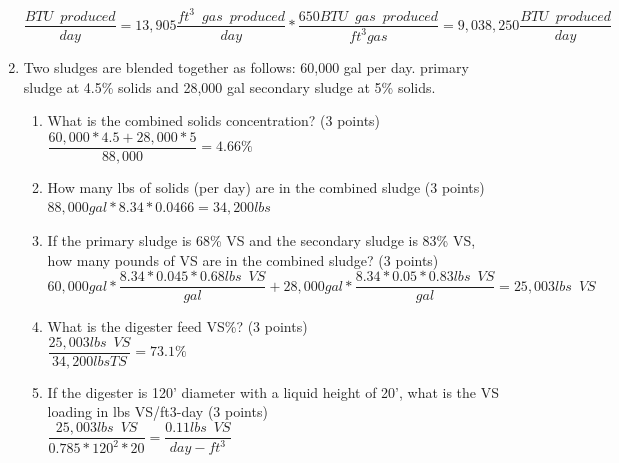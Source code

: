 \documentclass{article}
\begin{document}
\begin{enumerate}
{
$
	\dfrac 
	{
	BTU \enspace produced
	}
	{
	day
	}
	=
	13,905 \dfrac
			{
			ft^3 \enspace gas \enspace produced
			}
			{
			day
			}
			*
		\dfrac
		{
		650 BTU \enspace gas \enspace produced
		}
		{
		ft^3 gas
		}
		=9,038,250 \dfrac
				{
				BTU \enspace produced
				}
				{
				day
				}
$
}

\item Two sludges are blended together as follows: 60,000 gal per day. primary sludge at 4.5\% solids and 28,000 gal secondary sludge at 5\% solids. 
\begin{enumerate}
\item What is the combined solids concentration?  (3 points)\\

$\dfrac{60,000*4.5+28,000*5}{88,000}=\boxed{4.66\%}$\\
\vspace{2cm}
\item How many lbs of solids (per day) are in the combined sludge (3 points)\\

$88,000 gal*8.34*0.0466 = \boxed{34,200 lbs}$\\
\vspace{2cm}


\item If the primary sludge is 68\% VS and the secondary sludge is 83\% VS, how many pounds of VS are in the combined sludge? (3 points)\\
$60,000 gal *\dfrac{8.34*0.045*0.68lbs \enspace VS}{gal}+28,000 gal *\dfrac{8.34*0.05*0.83lbs \enspace VS}{gal}=\boxed{25,003 lbs \enspace VS}$
\vspace{2cm}

\item What is the digester feed VS\%?  (3 points)\\
$\dfrac{25,003 lbs \enspace VS}{34,200 lbs TS}=\boxed{73.1\%}$

\vspace{2cm}



\item If the digester is 120’ diameter with a liquid height of 20’, what is the VS loading in lbs VS/ft3-day (3 points)\\

$\dfrac{25,003 lbs \enspace VS}{0.785*120^2*20}=\boxed{\dfrac{0.11 lbs \enspace VS}{day-ft^3}}$\\
\vspace{2cm}






\end{enumerate}
\end{enumerate}
\end{document}
